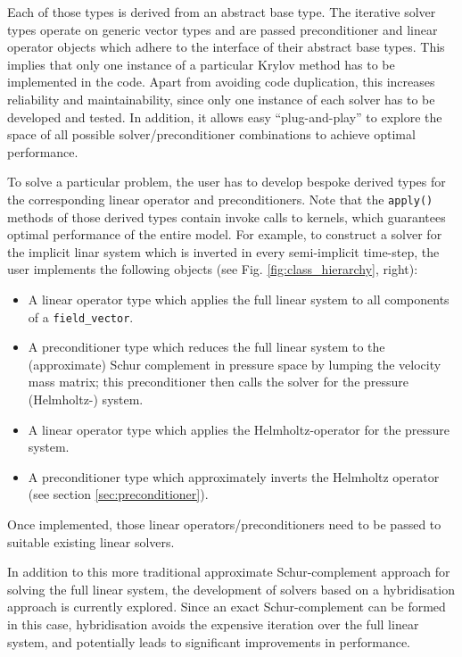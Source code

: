 \documentclass[review,times]{elsarticle}
\begin{document}
Each of those types is derived from an abstract base type. The
iterative solver types operate on generic vector types and are passed
preconditioner and linear operator objects which adhere to the
interface of their abstract base types.  This implies that only one
instance of a particular Krylov method has to be implemented in the
code. Apart from avoiding code duplication, this increases reliability
and maintainability, since only one instance of each solver has to be
developed and tested. In addition, it allows easy ``plug-and-play'' to
explore the space of all possible solver/preconditioner combinations
to achieve optimal performance.

To solve a particular problem, the user has to develop bespoke derived
types for the corresponding linear operator and preconditioners. Note
that the \texttt{apply()} methods of those derived types contain
invoke calls to kernels, which guarantees optimal performance of the entire
model. For example, to construct a solver for the implicit linar
system which is inverted in every semi-implicit time-step, the user
implements the following objects (see Fig. \ref{fig:class_hierarchy},
right):
\begin{itemize}
\item A linear operator type which applies the full linear system to
  all components of a \texttt{field\_vector}.
\item A preconditioner type which reduces the full linear system to
  the (approximate) Schur complement in pressure space by lumping the
  velocity mass matrix; this preconditioner then calls the solver for
  the pressure (Helmholtz-) system.
\item A linear operator type which applies the Helmholtz-operator for
  the pressure system.
\item A preconditioner type which approximately inverts the Helmholtz
  operator (see section \ref{sec:preconditioner}).
\end{itemize}
Once implemented, those linear operators/preconditioners need to be
passed to suitable existing linear solvers.

In addition to this more traditional approximate Schur-complement
approach for solving the full linear system, the development of
solvers based on a hybridisation approach is currently explored. Since
an exact Schur-complement can be formed in this case, hybridisation
avoids the expensive iteration over the full linear system, and
potentially leads to significant improvements in performance.
\end{document}
